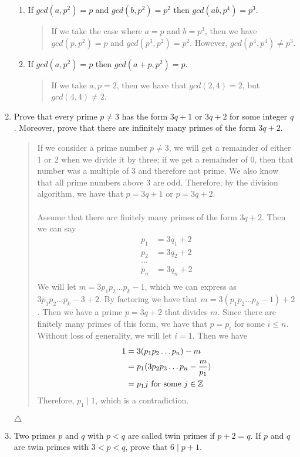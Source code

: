 \documentclass{hw}
\begin{document}
\begin{enumerate}
\begin{enumerate}
\item If $gcd(a, p^2) = p$ and $gcd(b, p^2) = p^2$ then $gcd(ab, p^4) = p^3$.
\begin{quote}
If we take the case where $a=p$ and $b=p^3$, then we have $gcd(p, p^2) = p$ and $gcd(p^3, p^2) = p^2$.
However, $gcd(p^4, p^4) \neq p^3$.
\end{quote}

\item If $gcd(a,p^2)=p$ then $gcd(a+p,p^2)=p$.
\begin{quote}
If we take $a,p=2$, then we have that $gcd(2,4)=2$, but $gcd(4,4)\neq 2$.
\end{quote}
\end{enumerate}



\item Prove that every prime $p\neq 3$ has the form $3q + 1$ or $3q + 2$ for some integer $q$. Moreover,
prove that there are infinitely many primes of the form $3q + 2$.
\begin{quote}
If we consider a prime number $p\neq 3$, we will get a remainder of either 1 or 2 when we divide it by
three; if we get a remainder of 0, then that number was a multiple of 3 and therefore not prime. We
also know that all prime numbers above 3 are odd. Therefore, by the division algorithm, we have that
$p=3q+1$ or $p=3q+2$.\\\\
Assume that there are finitely many primes of the form $3q + 2$. Then we can say
\begin{align*}
p_1 &= 3q_1 + 2\\
p_2 &= 3q_2 + 2\\
\dots& \\
p_n &= 3q_n + 2\\
\end{align*}
We will let $m = 3p_1p_2\dots p_k-1$, which we can express as $3p_1p_2\dots p_k-3+2$. By factoring
we have that $m=3(p_1p_2\dots p_k-1)+2$. Then we have a prime $p = 3q+2$ that divides $m$. Since there
are finitely many primes of this form, we have that $p=p_i$ for some $i \leq n$. Without loss of
generality, we will let $i=1$. Then we have
\begin{align*}
1 &= 3(p_1p_2\dots p_n)-m\\
&= p_1(3p_2p_3\dots p_n - {m\over p_1})\\
&= p_1j\text{ for some } j\in\mathbb{Z}
\end{align*}
Therefore, $p_1\mid1$, which is a contradiction.
\end{quote}
$\triangle$



\item Two primes $p$ and $q$ with $p<q$ are called twin primes if $p+2=q$. If $p$ and $q$ are twin primes
with $3 < p < q$, prove that $6 \mid p + 1$.
\begin{quote}

\end{quote}
\end{enumerate}
\end{document}
